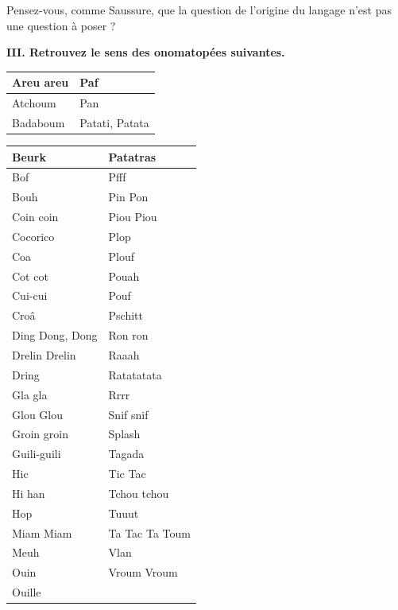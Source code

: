 Pensez-vous, comme Saussure, que la question de l’origine du langage n’est pas une question à poser ?

\noindent\textbf{III. Retrouvez le sens des onomatopées suivantes.}
\begin{center}\renewcommand{\arraystretch}{1.2}
\begin{tabularx}{.78\linewidth}{|*{2}{>{\centering\arraybackslash}X|}}
\hline Areu areu&Paf\\\hline
Atchoum&Pan\\\hline
Badaboum&Patati, Patata\\\hline
\end{tabularx}\end{center}

\begin{center}\small\renewcommand{\arraystretch}{1.18}
\begin{longtable}{|>{\centering\arraybackslash}p{.36\linewidth}|>{\centering\arraybackslash}p{.36\linewidth}|}
\hline
Beurk&Patatras\\\hline
Bof&Pfff\\\hline
Bouh&Pin Pon\\\hline
Coin coin&Piou Piou\\\hline
Cocorico&Plop\\\hline
Coa&Plouf\\\hline
Cot cot&Pouah\\\hline
Cui-cui&Pouf\\\hline
Croâ&Pschitt\\\hline
Ding Dong, Dong&Ron ron\\\hline
Drelin Drelin&Raaah\\\hline
Dring&Ratatatata\\\hline
Gla gla&Rrrr\\\hline
Glou Glou&Snif snif\\\hline
Groin groin&Splash\\\hline
Guili-guili&Tagada\\\hline
Hic&Tic Tac\\\hline
Hi han&Tchou tchou\\\hline
Hop&Tuuut\\\hline
Miam Miam&Ta Tac Ta Toum\\\hline
Meuh&Vlan\\\hline
Ouin&Vroum Vroum\\\hline
Ouille&\\\hline
\end{longtable}\end{center}

